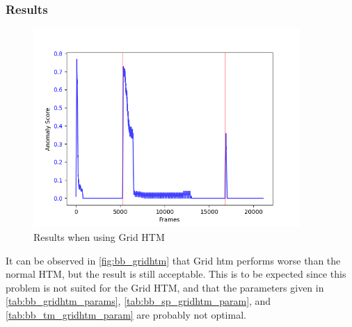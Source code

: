 \subsubsection{Results}
\begin{figure}[H]
    \centering
    \includegraphics[width=0.9\textwidth]{resources/experiments/bouncing_ball/bb_grid}
    \caption[Bouncing Ball Experiment Anomaly Score Grid HTM]{Results when using Grid HTM}
    \label{fig:bb_gridhtm}
\end{figure}
It can be observed in \autoref{fig:bb_gridhtm} that Grid \gls*{htm} performs worse than the normal HTM, but the result is still acceptable. This is to be expected since this problem is not suited for the Grid HTM, and that the parameters given in \autoref{tab:bb_gridhtm_params}, \autoref{tab:bb_sp_gridhtm_param}, and \autoref{tab:bb_tm_gridhtm_param} are probably not optimal.
